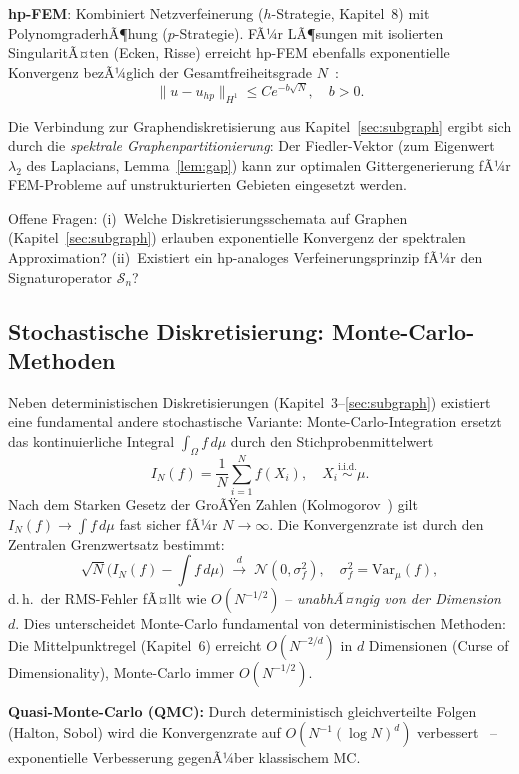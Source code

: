 ﻿\documentclass[a4paper,12pt]{article}
\theoremstyle{definition}
\begin{document}
\textbf{hp-FEM}: Kombiniert Netzverfeinerung ($h$-Strategie, Kapitel~8) mit
PolynomgraderhÃ¶hung ($p$-Strategie). FÃ¼r LÃ¶sungen mit isolierten SingularitÃ¤ten
(Ecken, Risse) erreicht hp-FEM ebenfalls exponentielle Konvergenz bezÃ¼glich der
Gesamtfreiheitsgrade $N$~\cite{schwab2004}:
\[
\|u - u_{hp}\|_{H^1} \leq C e^{-b\sqrt{N}}, \quad b > 0.
\]

Die Verbindung zur Graphendiskretisierung aus Kapitel~\ref{sec:subgraph} ergibt sich
durch die \emph{spektrale Graphenpartitionierung}: Der Fiedler-Vektor (zum Eigenwert
$\lambda_2$ des Laplacians, Lemma~\ref{lem:gap}) kann zur optimalen Gittergenerierung
fÃ¼r FEM-Probleme auf unstrukturierten Gebieten eingesetzt werden.

Offene Fragen: (i)~Welche Diskretisierungsschemata auf Graphen (Kapitel~\ref{sec:subgraph})
erlauben exponentielle Konvergenz der spektralen Approximation? (ii)~Existiert ein
hp-analoges Verfeinerungsprinzip fÃ¼r den Signaturoperator $\mathcal{S}_n$?

\subsection{Stochastische Diskretisierung: Monte-Carlo-Methoden}

Neben deterministischen Diskretisierungen (Kapitel~3--\ref{sec:subgraph}) existiert eine
fundamental andere stochastische Variante: Monte-Carlo-Integration ersetzt das
kontinuierliche Integral $\int_\Omega f\,d\mu$ durch den Stichprobenmittelwert
\[
I_N(f) = \frac{1}{N}\sum_{i=1}^N f(X_i), \quad X_i \overset{\text{i.i.d.}}{\sim} \mu.
\]
Nach dem Starken Gesetz der GroÃŸen Zahlen (Kolmogorov~\cite{kolmogorov1933}) gilt
$I_N(f) \to \int f\,d\mu$ fast sicher fÃ¼r $N \to \infty$. Die Konvergenzrate ist durch
den Zentralen Grenzwertsatz bestimmt:
\[
\sqrt{N}\bigl(I_N(f) - \int f\,d\mu\bigr) \;\xrightarrow{d}\; \mathcal{N}(0, \sigma_f^2),
\quad \sigma_f^2 = \mathrm{Var}_\mu(f),
\]
d.\,h.\ der RMS-Fehler fÃ¤llt wie $O(N^{-1/2})$ -- \emph{unabhÃ¤ngig von der Dimension $d$}.
Dies unterscheidet Monte-Carlo fundamental von deterministischen Methoden: Die
Mittelpunktregel (Kapitel~6) erreicht $O(N^{-2/d})$ in $d$ Dimensionen (Curse of
Dimensionality), Monte-Carlo immer $O(N^{-1/2})$.

\textbf{Quasi-Monte-Carlo (QMC):} Durch deterministisch gleichverteilte Folgen
(Halton, Sobol) wird die Konvergenzrate auf $O(N^{-1}(\log N)^d)$
verbessert~\cite{niederreiter1992} -- exponentielle Verbesserung gegenÃ¼ber klassischem MC.
\end{document}
